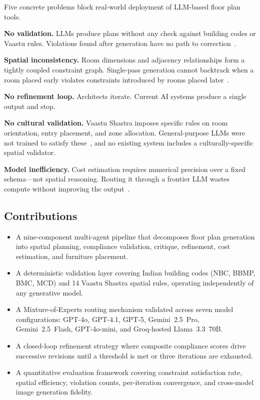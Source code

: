 \documentclass[journal]{IEEEtran}
\begin{document}
Five concrete problems block real-world deployment of LLM-based floor plan tools.

\textbf{No validation.} LLMs produce plans without any check against building
codes or Vaastu rules. Violations found after generation have no path to
correction~\cite{b7}.

\textbf{Spatial inconsistency.} Room dimensions and adjacency relationships
form a tightly coupled constraint graph. Single-pass generation cannot
backtrack when a room placed early violates constraints introduced by rooms
placed later~\cite{b5}.

\textbf{No refinement loop.} Architects iterate. Current AI systems produce
a single output and stop.

\textbf{No cultural validation.} Vaastu Shastra imposes specific rules on
room orientation, entry placement, and zone allocation. General-purpose LLMs
were not trained to satisfy these~\cite{b11}, and no existing system includes
a culturally-specific spatial validator.

\textbf{Model inefficiency.} Cost estimation requires numerical precision over
a fixed schema---not spatial reasoning. Routing it through a frontier LLM
wastes compute without improving the output~\cite{b10}.

\subsection{Contributions}

\begin{itemize}
    \item A nine-component multi-agent pipeline that decomposes floor plan
    generation into spatial planning, compliance validation, critique,
    refinement, cost estimation, and furniture placement.

    \item A deterministic validation layer covering Indian building codes
    (NBC, BBMP, BMC, MCD) and 14 Vaastu Shastra spatial rules, operating
    independently of any generative model.

    \item A Mixture-of-Experts routing mechanism validated across seven
    model configurations: GPT-4o, GPT-4.1, GPT-5, Gemini~2.5~Pro,
    Gemini~2.5~Flash, GPT-4o-mini, and Groq-hosted Llama~3.3~70B.

    \item A closed-loop refinement strategy where composite compliance scores
    drive successive revisions until a threshold is met or three iterations
    are exhausted.

    \item A quantitative evaluation framework covering constraint satisfaction
    rate, spatial efficiency, violation counts, per-iteration convergence, and
    cross-model image generation fidelity.
\end{itemize}
\end{document}
